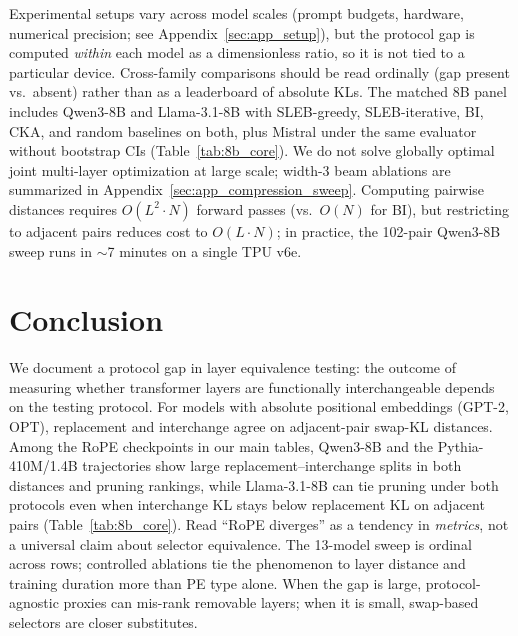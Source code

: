 \documentclass{article}
\begin{document}
Experimental setups vary across model scales (prompt budgets, hardware, numerical precision; see Appendix~\ref{sec:app_setup}), but the protocol gap is computed \emph{within} each model as a dimensionless ratio, so it is not tied to a particular device. Cross-family comparisons should be read ordinally (gap present vs.\ absent) rather than as a leaderboard of absolute KLs. The matched 8B panel includes Qwen3-8B and Llama-3.1-8B with SLEB-greedy, SLEB-iterative, BI, CKA, and random baselines on both, plus Mistral under the same evaluator without bootstrap CIs (Table~\ref{tab:8b_core}). We do not solve globally optimal joint multi-layer optimization at large scale; width-3 beam ablations are summarized in Appendix~\ref{sec:app_compression_sweep}. Computing pairwise distances requires $O(L^2 \cdot N)$ forward passes (vs.\ $O(N)$ for BI), but restricting to adjacent pairs reduces cost to $O(L \cdot N)$; in practice, the 102-pair Qwen3-8B sweep runs in ${\sim}$7 minutes on a single TPU v6e.

\section{Conclusion}
\label{sec:conclusion}

We document a protocol gap in layer equivalence testing: the outcome of measuring whether transformer layers are functionally interchangeable depends on the testing protocol. For models with absolute positional embeddings (GPT-2, OPT), replacement and interchange agree on adjacent-pair swap-KL distances. Among the RoPE checkpoints in our main tables, Qwen3-8B and the Pythia-410M/1.4B trajectories show large replacement--interchange splits in both distances and pruning rankings, while Llama-3.1-8B can tie pruning under both protocols even when interchange KL stays below replacement KL on adjacent pairs (Table~\ref{tab:8b_core}). Read ``RoPE diverges'' as a tendency in \emph{metrics}, not a universal claim about selector equivalence. The 13-model sweep is ordinal across rows; controlled ablations tie the phenomenon to layer distance and training duration more than PE type alone. When the gap is large, protocol-agnostic proxies can mis-rank removable layers; when it is small, swap-based selectors are closer substitutes.
\end{document}
